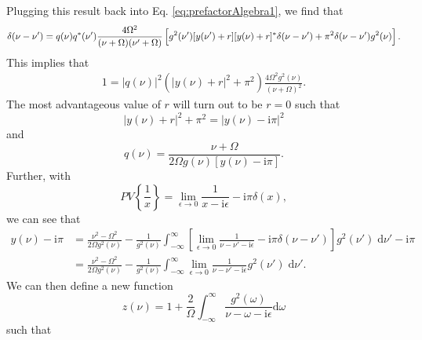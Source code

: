 Plugging this result back into Eq. \eqref{eq:prefactorAlgebra1}, we find that
\begin{equation}
\delta(\nu - \nu') = q(\nu)q^*(\nu')\frac{4\Omega^2}{(\nu + \Omega)(\nu' + \Omega)}\left[g^2(\nu')[y(\nu') + r][y(\nu) + r]^*\delta(\nu - \nu') + \pi^2\delta(\nu - \nu')g^2(\nu) \vphantom{\sum} \right].
\end{equation}
This implies that
\begin{equation}
\begin{split}
1 = |q(\nu)|^2(|y(\nu) + r|^2 + \pi^2)\frac{4\Omega^2g^2(\nu)}{(\nu + \Omega)^2}.
\end{split}
\end{equation}
The most advantageous value of $r$ will turn out to be $r = 0$ such that
\begin{equation}
|y(\nu) + r|^2 + \pi^2 = |y(\nu) - \mathrm{i}\pi|^2
\end{equation}
and
\begin{equation}
q(\nu) = \frac{\nu + \Omega}{2\Omega g(\nu)[y(\nu) - \mathrm{i}\pi]}.
\end{equation}
Further, with
\begin{equation}
PV\left\{\frac{1}{x}\right\} = \lim_{\epsilon\to0}\frac{1}{x - \mathrm{i}\epsilon} - \mathrm{i}\pi\delta(x),
\end{equation}
we can see that
\begin{equation}
\begin{split}
y(\nu) - \mathrm{i}\pi &= \frac{\nu^2 - \Omega^2}{2\Omega g^2(\nu)} - \frac{1}{g^2(\nu)}\int_{-\infty}^\infty\left[\lim_{\epsilon\to0}\frac{1}{\nu - \nu' - \mathrm{i}\epsilon} - \mathrm{i}\pi\delta(\nu - \nu')\right]g^2(\nu')\;\mathrm{d}\nu' - \mathrm{i}\pi\\
&= \frac{\nu^2 - \Omega^2}{2\Omega g^2(\nu)} - \frac{1}{g^2(\nu)}\int_{-\infty}^\infty\lim_{\epsilon\to0}\frac{1}{\nu - \nu' - \mathrm{i}\epsilon}g^2(\nu')\;\mathrm{d}\nu'.
\end{split}
\end{equation}
We can then define a new function
\begin{equation}
z(\nu) = 1 + \frac{2}{\Omega}\int_{-\infty}^\infty \frac{g^2(\omega)}{\nu - \omega - \mathrm{i}\epsilon}\mathrm{d}\omega
\end{equation}
such that
